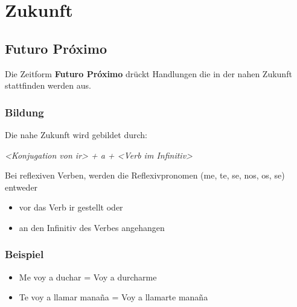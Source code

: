 \documentclass{../spanish_summary}
\begin{document}
\chapter*{Zukunft}
\section*{Futuro Próximo}
Die Zeitform \textbf{Futuro Próximo} drückt Handlungen die in der nahen Zukunft stattfinden werden aus.\\[2ex]
\subsection*{Bildung}
Die nahe Zukunft wird gebildet durch:\\

\begin{center}
\textit{<Konjugation von ir> + a + <Verb im Infinitiv>}\\[2ex]
\end{center}

Bei reflexiven Verben, werden die Reflexivpronomen (me, te, se, nos, os, se) entweder
\begin{itemize}
  \item vor das Verb ir gestellt oder
  \item an den Infinitiv des Verbes angehangen
\end{itemize}
\bigskip
\subsection*{Beispiel}
\begin{itemize}
\item Me voy a duchar = Voy a durcharme
\item Te voy a llamar mana\~{n}a = Voy a llamarte mana\~{n}a
\end{itemize}

\newpage
\end{document}
